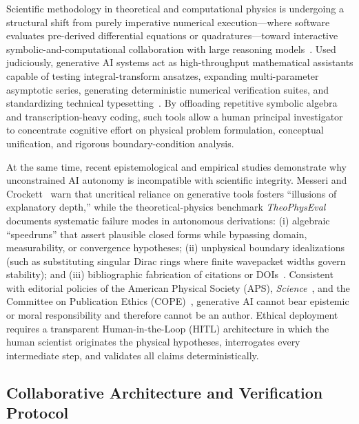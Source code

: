 \documentclass[aps,pra,onecolumn,notitlepage,11pt,tightenlines,amsmath,amssymb,floatfix,longbibliography]{revtex4-2}
\begin{document}
Scientific methodology in theoretical and computational physics is undergoing a structural shift from purely imperative numerical execution—where software evaluates pre-derived differential equations or quadratures—toward interactive symbolic-and-computational collaboration with large reasoning models~\cite{Wang2023NatureAI,OToole2024,VillaescusaNavarro2025}. Used judiciously, generative AI systems act as high-throughput mathematical assistants capable of testing integral-transform ansatzes, expanding multi-parameter asymptotic series, generating deterministic numerical verification suites, and standardizing technical typesetting~\cite{Haber2025,Jauhiainen2026}. By offloading repetitive symbolic algebra and transcription-heavy coding, such tools allow a human principal investigator to concentrate cognitive effort on physical problem formulation, conceptual unification, and rigorous boundary-condition analysis.

At the same time, recent epistemological and empirical studies demonstrate why unconstrained AI autonomy is incompatible with scientific integrity. Messeri and Crockett~\cite{Messeri2024} warn that uncritical reliance on generative tools fosters ``illusions of explanatory depth,'' while the theoretical-physics benchmark \emph{TheoPhysEval}~\cite{Chandra2026TheoPhysEval} documents systematic failure modes in autonomous derivations: (i) algebraic ``speedruns'' that assert plausible closed forms while bypassing domain, measurability, or convergence hypotheses; (ii) unphysical boundary idealizations (such as substituting singular Dirac rings where finite wavepacket widths govern stability); and (iii) bibliographic fabrication of citations or DOIs~\cite{Kacena2024}. Consistent with editorial policies of the American Physical Society (APS), \emph{Science}~\cite{Thorp2023Science}, and the Committee on Publication Ethics (COPE)~\cite{COPE2023AI}, generative AI cannot bear epistemic or moral responsibility and therefore cannot be an author. Ethical deployment requires a transparent Human-in-the-Loop (HITL) architecture in which the human scientist originates the physical hypotheses, interrogates every intermediate step, and validates all claims deterministically.

\subsection{Collaborative Architecture and Verification Protocol}
\label{subsec:ai_architecture}
\end{document}
